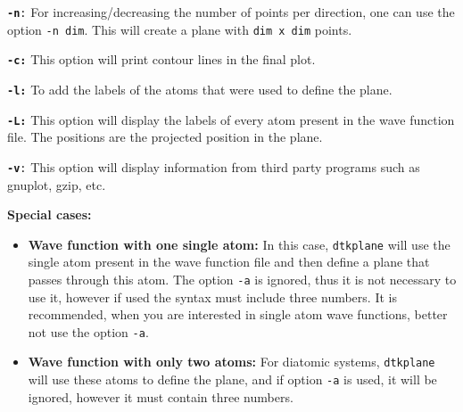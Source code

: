 \texttt{\textbf{-n}:} For increasing/decreasing the number of points per direction, one can use the option \texttt{-n dim}. This will create a plane with \texttt{dim x dim} points.

\texttt{\textbf{-c:}} This option will print contour lines in the final plot.

\texttt{\textbf{-l:}} To add the labels of the atoms that were used to define the plane.

\texttt{\textbf{-L:}} This option will display the labels of every atom present in the wave function file. The positions are the projected position in the plane.

\texttt{\textbf{-v}:} This option will display information from third party programs such as gnuplot, gzip, etc.

\textbf{Special cases:}
\begin{itemize}
   \item \textbf{Wave function with one single atom:} In this case, \texttt{dtkplane} will use the single atom present in the wave function file and then define a plane that passes through this atom. The option \texttt{-a} is ignored, thus it is not necessary to use it, however if used the syntax must include three numbers. It is recommended, when you are interested in single atom wave functions, better not use the option \texttt{-a}.
   \item \textbf{Wave function with only two atoms:} For diatomic systems, \texttt{dtkplane} will use these atoms to define the plane, and if option \texttt{-a} is used, it will be ignored, however it must contain three numbers.
\end{itemize}

